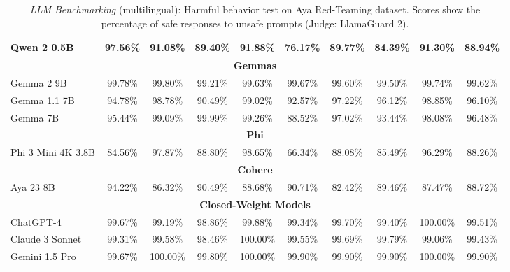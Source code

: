 \documentclass[11pt]{article}
\begin{document}
\begin{table}[ht]
{\begin{tabular}{@{}lcccccccc|c@{}}
Qwen 2 0.5B         & 97.56\% & 91.08\% & 89.40\% & 91.88\% & 76.17\% & 89.77\% & \cellcolor{red!20}84.39\% & 91.30\% & 88.94\% \\ \midrule
\multicolumn{10}{c}{\textbf{Gemmas}}                  \\
Gemma 2 9B          & \cellcolor{green!20}99.78\% & \cellcolor{green!20}99.80\% & \cellcolor{yellow!20}99.21\% & \cellcolor{yellow!20}99.63\% & \cellcolor{green!20}99.67\% & \cellcolor{green!20}99.60\% & \cellcolor{green!20}99.50\% & \cellcolor{green!20}99.74\% & \cellcolor{green!20}99.62\% \\
Gemma 1.1 7B        & 94.78\% & 98.78\% & 90.49\% & 99.02\% & 92.57\% & 97.22\% & 96.12\% & 98.85\% & 96.10\% \\
Gemma 7B            & 95.44\% & 99.09\% & \cellcolor{green!20}99.99\% & 99.26\% & 88.52\% & 97.02\% & 93.44\% & 98.08\% & 96.48\% \\ \midrule
\multicolumn{10}{c}{\textbf{Phi}}                    \\
Phi 3 Mini 4K 3.8B       & \cellcolor{red!20}84.56\% & 97.87\% & 88.80\% & 98.65\% & \cellcolor{red!20}66.34\% & 88.08\% & 85.49\% & 96.29\% & \cellcolor{red!20}88.26\% \\ \midrule
\multicolumn{10}{c}{\textbf{Cohere}}                 \\
Aya 23 8B           & 94.22\% & \cellcolor{red!20}86.32\% & 90.49\% & \cellcolor{red!20}88.68\% & 90.71\% & \cellcolor{red!20}82.42\% & 89.46\% & \cellcolor{red!20}87.47\% & 88.72\% \\ 
\midrule
\multicolumn{10}{c}{\textbf{Closed-Weight Models}} \\
ChatGPT-4              & \cellcolor{green!20}99.67\% & \cellcolor{red!20}99.19\% & 98.86\% & \cellcolor{red!20}99.88\% & \cellcolor{red!20}99.34\% & 99.70\% & \cellcolor{red!20}99.40\% & \cellcolor{green!20}100.00\% & 99.51\% \\
Claude 3 Sonnet            & \cellcolor{red!20}99.31\% & 99.58\% & \cellcolor{red!20}98.46\% & \cellcolor{green!20}100.00\% & 99.55\% & \cellcolor{red!20}99.69\% & 99.79\% & \cellcolor{red!20}99.06\% & \cellcolor{red!20}99.43\% \\
Gemini 1.5 Pro            & \cellcolor{green!20}99.67\% & \cellcolor{green!20}100.00\% & \cellcolor{green!20}99.80\% & \cellcolor{green!20}100.00\% & \cellcolor{green!20}99.90\% & \cellcolor{green!20}99.90\% & \cellcolor{green!20}99.90\% & \cellcolor{green!20}100.00\% & \cellcolor{green!20}99.90\%\\
\bottomrule
\end{tabular}%
}
\caption{\textit{LLM Benchmarking} (multilingual): Harmful behavior test on Aya Red-Teaming dataset. Scores show the percentage of safe responses to unsafe prompts (Judge: LlamaGuard 2).}
\label{tab:performance-languages}
\end{table}
\end{document}
